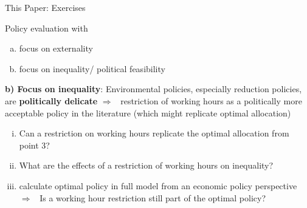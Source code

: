 \documentclass[11pt,aspectratio=169]{beamer}
\newcommand{\ar}{$\Rightarrow$ \ }
\begin{document}
\begin{frame}{This Paper: Exercises}
	\begin{block}{Policy evaluation with}
		\begin{enumerate}[a)]
			\item focus on externality
			\item focus on inequality/ political feasibility
		\end{enumerate}
	\end{block} 
\pause
		\textbf{b) Focus on inequality}: Environmental policies, especially reduction policies, are \textbf{\alert{politically delicate}} \ar restriction of working hours as a politically more acceptable policy in the literature (which might replicate optimal allocation)
	\begin{enumerate}[(i)]
		\item Can a restriction on working hours replicate the optimal allocation from point 3?
		\item What are the effects of a restriction of working hours on inequality? 
		\item calculate optimal policy in full model from an economic policy perspective \ar Is a working hour restriction still part of the optimal policy? 
	\end{enumerate}
\end{frame}
\end{document}
